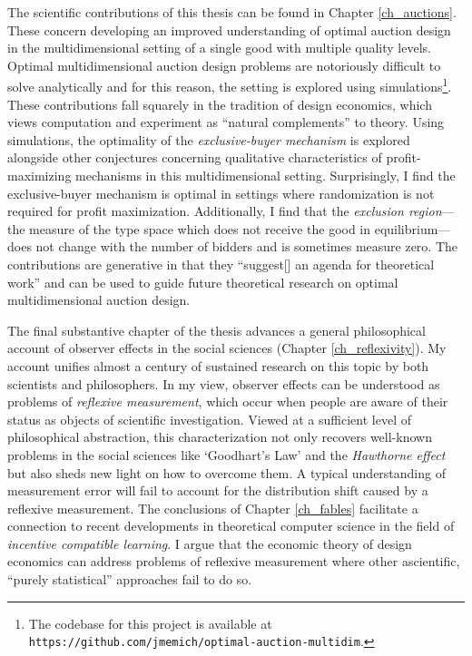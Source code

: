 The scientific contributions of this thesis can be found in Chapter \ref{ch_auctions}. These concern developing an improved understanding of optimal auction design in the multidimensional setting of a single good with multiple quality levels. Optimal multidimensional auction design problems are notoriously difficult to solve analytically and for this reason, the setting is explored using simulations\footnote{The codebase for this project is available at \texttt{https://github.com/jmemich/optimal-auction-multidim}.}. These contributions fall squarely in the tradition of design economics, which views computation and experiment as ``natural complements'' \autocite[above]{roth2002} to theory. Using simulations, the optimality of the \textit{exclusive-buyer mechanism} is explored alongside other conjectures concerning qualitative characteristics of profit-maximizing mechanisms in this multidimensional setting. Surprisingly, I find the exclusive-buyer mechanism is optimal in settings where randomization is not required for profit maximization. Additionally, I find that the \textit{exclusion region}---the measure of the type space which does not receive the good in equilibrium---does not change with the number of bidders and is sometimes measure zero. The contributions are generative in that they ``suggest[] an agenda for theoretical work'' \autocite[above]{roth2002} and can be used to guide future theoretical research on optimal multidimensional auction design.

The final substantive chapter of the thesis advances a general philosophical account of observer effects in the social sciences (Chapter \ref{ch_reflexivity}). My account unifies almost a century of sustained research on this topic by both scientists and philosophers. In my view, observer effects can be understood as problems of \textit{reflexive measurement}, which occur when people are aware of their status as objects of scientific investigation. Viewed at a sufficient level of philosophical abstraction, this characterization not only recovers well-known problems in the social sciences like `Goodhart's Law' and the \textit{Hawthorne effect} but also sheds new light on how to overcome them. A typical understanding of measurement error will fail to account for the distribution shift caused by a reflexive measurement. The conclusions of Chapter \ref{ch_fables} facilitate a connection to recent developments in theoretical computer science in the field of \textit{incentive compatible learning}. I argue that the economic theory of design economics can address problems of reflexive measurement where other ascientific, ``purely statistical'' \autocite[319]{marget1929} approaches fail to do so. 

